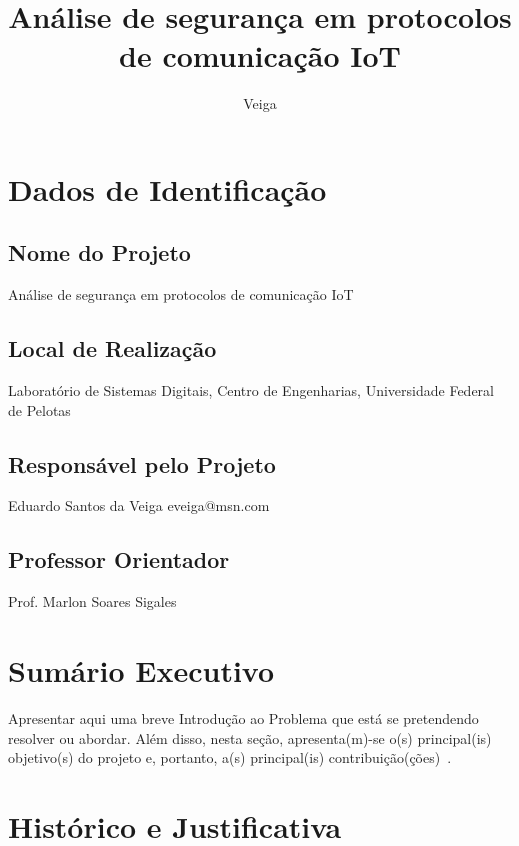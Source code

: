 \documentclass[tcc-proposta]{texufpel}
\title{Análise de segurança em protocolos de comunicação IoT}
\author{Veiga}{Eduardo Santos da}
\begin{document}

\maketitle 
\sloppy

\chapter{Dados de Identificação}

\section{Nome do Projeto}
Análise de segurança em protocolos de comunicação IoT

\section{Local de Realização}
Laboratório de Sistemas Digitais, Centro de Engenharias, Universidade Federal de Pelotas

\section{Responsável pelo Projeto}
Eduardo Santos da Veiga
eveiga@msn.com

\section{Professor Orientador}Prof. Marlon Soares Sigales

\chapter{Sumário Executivo}

Apresentar aqui uma breve Introdução ao Problema que está se
pretendendo resolver ou abordar. Além disso, nesta seção,
apresenta(m)-se o(s) principal(is) objetivo(s) do projeto e, portanto,
a(s) principal(is) contribuição(ções)~\citet{Moore:1979:MAI,Aguiar:2005}.

\chapter{Histórico e Justificativa}
\end{document}
